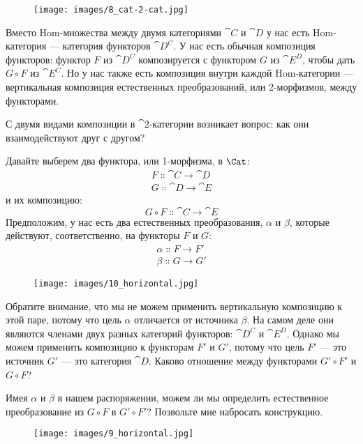 \begin{figure}[H]
  \centering
  \texttt{[image: images/8\_cat-2-cat.jpg]}
\end{figure}

\noindent
Вместо Hom-множества между двумя категориями $\cat{C}$ и $\cat{D}$ у нас есть
Hom-категория --- категория функторов $\cat{D^C}$. У нас есть
обычная композиция функторов: функтор $F$ из $\cat{D^C}$
композируется с функтором $G$ из $\cat{E^D}$, чтобы дать $G \circ F$ из
$\cat{E^C}$. Но у нас также есть композиция внутри каждой
Hom-категории --- вертикальная композиция естественных преобразований, или
2-морфизмов, между функторами.

С двумя видами композиции в $\cat{2}$-категории возникает вопрос: как
они взаимодействуют друг с другом?

Давайте выберем два функтора, или 1-морфизма, в $\Cat$:
\begin{gather*}
  F \Colon \cat{C} \to \cat{D} \\
  G \Colon \cat{D} \to \cat{E}
\end{gather*}
и их композицию:
\[G \circ F \Colon \cat{C} \to \cat{E}\]
Предположим, у нас есть два естественных преобразования, $\alpha$ и $\beta$, которые действуют,
соответственно, на функторы $F$ и $G$:
\begin{gather*}
  \alpha \Colon F \to F' \\
  \beta \Colon G \to G'
\end{gather*}

\begin{figure}[H]
  \centering
  \texttt{[image: images/10\_horizontal.jpg]}
\end{figure}

\noindent
Обратите внимание, что мы не можем применить вертикальную композицию к этой паре, потому что
цель $\alpha$ отличается от источника $\beta$. На самом деле они являются
членами двух разных категорий функторов: $\cat{D^C}$ и $\cat{E^D}$.
Однако мы можем применить композицию к функторам
$F'$ и $G'$, потому что цель $F'$ --- это источник $G'$ --- это
категория $\cat{D}$. Каково отношение между функторами $G' \circ F'$ и $G \circ F$?

Имея $\alpha$ и $\beta$ в нашем распоряжении, можем ли мы определить естественное преобразование
из $G \circ F$ в $G' \circ F'$? Позвольте мне набросать конструкцию.

\begin{figure}[H]
  \centering
  \texttt{[image: images/9\_horizontal.jpg]}
\end{figure}

